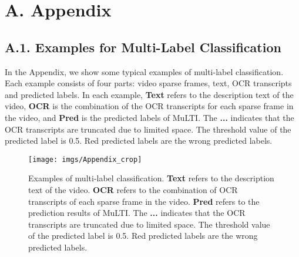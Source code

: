 \documentclass[10pt,twocolumn,letterpaper]{article}
\begin{document}
{\small


}

\clearpage
\onecolumn
\section*{A. Appendix}
\subsection*{A.1. Examples for Multi-Label Classification}
\vspace{-1.5ex}
\begin{multicols}{2} 
In the Appendix, we show some typical examples of multi-label classification. Each example consists of four parts: video sparse frames, text, OCR transcripts and predicted labels. In each example, \textbf{Text} refers to the description text of the video, \textbf{OCR} is the combination of the OCR transcripts for each sparse frame in the video, and \textbf{Pred} is the predicted labels of MuLTI. The \textbf{...} indicates that the OCR transcripts are truncated due to limited space. The threshold value of the predicted label is 0.5. Red predicted labels are the wrong predicted labels.
\end{multicols}
\begin{figure*}[ht]
\centering
\texttt{[image: imgs/Appendix\_crop]}
\vspace{1ex}
\caption{
Examples of multi-label classification. \textbf{Text} refers to the description text of the video. \textbf{OCR} refers to the combination of OCR transcripts of each sparse frame in the video. \textbf{Pred} refers to the prediction results of MuLTI. The \textbf{...} indicates that the OCR transcripts are truncated due to limited space. The threshold value of the predicted label is 0.5. Red predicted labels are the wrong predicted labels.
}
\vspace{1ex}
\label{fig:appendix}
\end{figure*}
  
\end{document}
